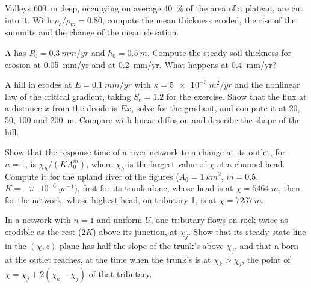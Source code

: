 \begin{exercise}[$\star\star$]\label{exo:b3:quantitative-geomorphology:8}
Valleys \qty{600}{m} deep, occupying on average \qty{40}{\percent} of the
area of a plateau, are cut into it. With $\rho_c/\rho_m = 0.80$, compute
the mean thickness eroded, the rise of the summits and the change of the
mean elevation.
\end{exercise}

\begin{exercise}[$\star\star$]\label{exo:b3:quantitative-geomorphology:9}
A  has $P_0 = \qty{0.3}{mm/yr}$ and $h_0 =
\qty{0.5}{m}$. Compute the steady soil thickness for erosion at
\qty{0.05}{mm/yr} and at \qty{0.2}{mm/yr}. What happens at
\qty{0.4}{mm/yr}?
\end{exercise}

\begin{exercise}[$\star\star\star$]\label{exo:b3:quantitative-geomorphology:10}
A hill in  erodes at $E = \qty{0.1}{mm/yr}$ with $\kappa =
\qty{5e-3}{m^2/yr}$ and the nonlinear law of the critical gradient, taking
$S_c = 1.2$ for the exercise. Show that the flux at a distance $x$ from the
divide is $E x$, solve for the gradient, and compute it at 20, 50, 100 and
\qty{200}{m}. Compare with linear diffusion and describe the shape of the
hill.
\end{exercise}

\begin{exercise}[$\star\star\star$]\label{exo:b3:quantitative-geomorphology:11}
Show that the response time of a river network to a change at its outlet,
for $n = 1$, is $\chi_h/(K A_0^m)$, where $\chi_h$ is the largest value of
$\chi$ at a channel head. Compute it for the upland river of the figures
($A_0 = \qty{1}{km^2}$, $m = 0.5$, $K = \qty{e-6}{yr^{-1}}$), first for its
trunk alone, whose head is at $\chi = \qty{5464}{m}$, then for the network,
whose highest head, on tributary 1, is at $\chi = \qty{7237}{m}$.
\end{exercise}

\begin{exercise}[$\star\star\star$]\label{exo:b3:quantitative-geomorphology:12}
In a network with $n = 1$ and uniform $U$, one tributary flows on rock twice
as erodible as the rest ($2K$) above its junction, at $\chi_j$. Show that
its steady-state line in the $(\chi, z)$ plane has half the slope of the
trunk's above $\chi_j$, and that a  born at the outlet reaches,
at the time when the trunk's  is at $\chi_k > \chi_j$, the point
of $\chi = \chi_j + 2(\chi_k - \chi_j)$ of that tributary.
\end{exercise}

